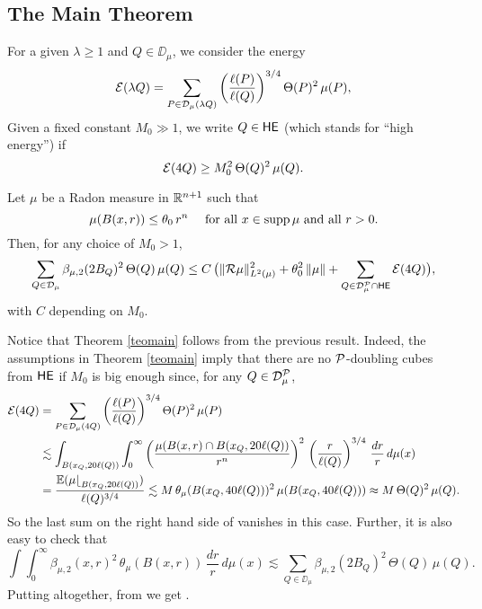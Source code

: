 \vv



\subsection{The Main Theorem}\label{subsec:main thm}


For a given $\lambda\geq1$ and $Q\in\DD_\mu$, we  consider the energy
$${\mathcal E}(\lambda Q) = \sum_{P\in{\mathcal D}_\mu(\lambda Q)} \left(\frac{\ell(P)}{\ell(Q)}\right)^{3/4}\Theta(P)^2\,\mu(P),$$
Given a fixed constant $M_0\gg1$, we write $Q\in {\mathsf {HE}}$ (which stands for ``high energy'') if
$${\mathcal E}(4Q)\geq M_0^2\,\Theta(Q)^2\,\mu(Q).$$

\begin{theorem}\label{propomain}
	Let $\mu$ be a Radon measure in ${\mathbb R}^{n+1}$ such that
	$$
	\mu(B(x,r))\leq \theta_0\,r^n\quad \mbox{ for all $x\in\operatorname{supp}\mu$ and all $r>0$}.
	$$
	Then, for any choice of $M_0>1$,
	\begin{equation}\label{eqpropo*}
		\sum_{Q\in{\mathcal D}_\mu} \beta_{\mu,2}(2B_Q)^2\,\Theta(Q)\,\mu(Q)\leq C\,\big(\|{\mathcal R}\mu\|_{L^2(\mu)}^2 + \theta_0^2\,\|\mu\|
		+ \sum_{Q\in{\mathcal D}_\mu^{\mathcal P}\cap{\mathsf {HE}}}{\mathcal E}(4Q)\big),
	\end{equation}
	with $C$ depending on $M_0$.
\end{theorem}


\vv
Notice that Theorem \ref{teomain} follows from the previous result. Indeed, the assumptions in Theorem \ref{teomain}
imply that there are no ${\mathcal P}$-doubling cubes from ${\mathsf {HE}}$ if $M_0$ is big enough since,  for any $Q\in{\mathcal D}_\mu^{\mathcal P}$,
\begin{align*}
	{\mathcal E}(4Q) &= \sum_{P\in{\mathcal D}_\mu(4 Q)} \left(\frac{\ell(P)}{\ell(Q)}\right)^{3/4}\Theta(P)^2\,\mu(P)\\
	&
	\lesssim \int_{B(x_Q,20\ell(Q))} \int_0^\infty \left(\frac{\mu(B(x,r)\cap B(x_Q,20\ell(Q))}{r^n}\right)^2   \,\left(\frac r{\ell(Q)}\right)^{3/{4}}\,\frac{dr}r\,d\mu(x)\\
	& = \frac{\mathbb E(\mu{\lfloor}_{B(x_Q,20\ell(Q))})}{\ell(Q)^{3/4}} \lesssim M\,\theta_\mu(B(x_Q,40\ell(Q)))^2\,\mu(B(x_Q,40\ell(Q)))
	\approx M\,\Theta(Q)^2\,\mu(Q).
\end{align*}
So the last sum on the right hand side of  vanishes in this case.
Further, it is also easy to check that
$$\int \!\!\int_0^\infty \beta_{\mu,2}(x,r)^2\,\theta_\mu(B(x,r))\,
\frac{dr}r\,d\mu(x) \lesssim \sum_{Q\in\DD_\mu} \beta_{\mu,2}(2B_Q)^2\,\Theta(Q)\,\mu(Q).$$
Putting altogether, from  we get .

